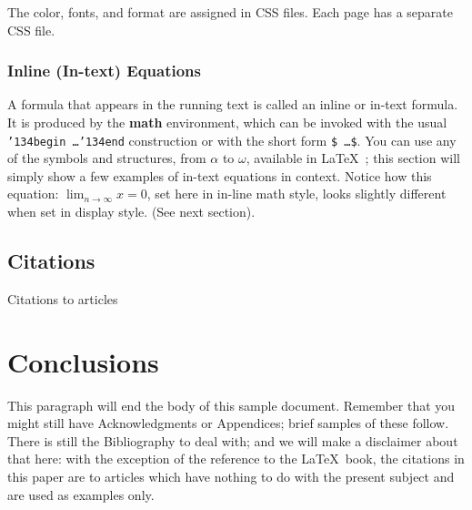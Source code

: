 The color, fonts, and format are assigned in CSS files. Each page has a separate CSS file. 

\subsubsection{Inline (In-text) Equations}
A formula that appears in the running text is called an
inline or in-text formula.  It is produced by the
\textbf{math} environment, which can be
invoked with the usual \texttt{{\char'134}begin\,\ldots{\char'134}end}
construction or with the short form \texttt{\$\,\ldots\$}. You
can use any of the symbols and structures,
from $\alpha$ to $\omega$, available in
\LaTeX~\cite{Lamport:LaTeX}; this section will simply show a
few examples of in-text equations in context. Notice how
this equation:
\begin{math}
  \lim_{n\rightarrow \infty}x=0
\end{math},
set here in in-line math style, looks slightly different when
set in display style.  (See next section).

\subsection{Citations}
Citations to articles

\section{Conclusions}
This paragraph will end the body of this sample document.
Remember that you might still have Acknowledgments or
Appendices; brief samples of these
follow.  There is still the Bibliography to deal with; and
we will make a disclaimer about that here: with the exception
of the reference to the \LaTeX\ book, the citations in
this paper are to articles which have nothing to
do with the present subject and are used as
examples only.



